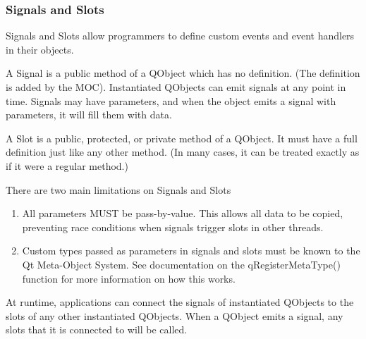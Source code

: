 \subsubsection*{Signals and Slots}
Signals and Slots allow programmers to define custom events and event handlers in their objects. 

A Signal is a public method of a QObject which has no definition. (The definition is added by the MOC). Instantiated QObjects can emit signals at any point in time. Signals may have parameters, and when the object emits a signal with parameters, it will fill them with data.

A Slot is a public, protected, or private method of a QObject. It must have a full definition just like any other method. (In many cases, it can be treated exactly as if it were a regular method.)

There are two main limitations on Signals and Slots
\begin{enumerate}
	\item All parameters MUST be pass-by-value. This allows all data to be copied, preventing race conditions when signals trigger slots in other threads.
	\item Custom types passed as parameters in signals and slots must be known to the Qt Meta-Object System. See documentation on the qRegisterMetaType() function for more information on how this works.
\end{enumerate}

At runtime, applications can connect the signals of instantiated QObjects to the slots of any other instantiated QObjects. When a QObject emits a signal, any slots that it is connected to will be called.


